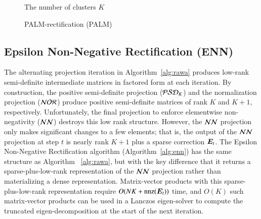 \begin{figure}[ht]
  \begin{algorithm}[H]
		\DontPrintSemicolon
		\hspace{28px} The number of clusters $K$\\
		\caption{PALM-rectification (PALM)}
	  \label{alg:palm}      
	\end{algorithm}
\end{figure}

\subsection{Epsilon Non-Negative Rectification (ENN)}
The alternating projection iteration in Algorithm~\ref{alg:rawa} produces
low-rank semi-definite intermediate matrices in factored form at each iteration.
By construction, the positive semi-definite projection ($\mathcal{PSD}_K$) and the
normalization projection ($\mathcal{NOR}$) produce positive semi-definite matrices of
rank $K$ and $K+1$, respectively.  Unfortunately, the final projection to
enforce elementwise non-negativity ($\mathcal{NN}$) destroys this low rank structure.
However, the $\mathcal{NN}$ projection only makes significant changes to a few elements;
that is, the output of the $\mathcal{NN}$ projection at step $t$ is nearly rank $K+1$
plus a sparse correction $\bm{E}_t$.  The Epsilon Non-Negative Rectification
algorithm (Algorithm~\ref{alg:enn}) has the same structure as Algorithm~
\ref{alg:rawa}, but with the key difference that it returns a
sparse-plus-low-rank representation of the $\mathcal{NN}$ projection rather than
materializing a dense representation. Matrix-vector products with this
sparse-plus-low-rank representation require $O(NK + \operatorname{nnz}(\bm{E}_t))$
time, and $O(K)$ such matrix-vector products can be used in a Lanczos
eigen-solver to compute the truncated eigen-decomposition at the start of the
next iteration.

